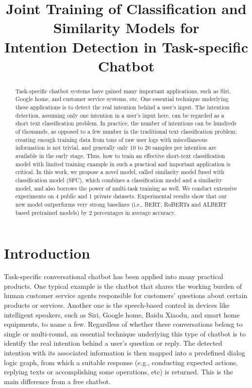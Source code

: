 \documentclass[letterpaper]{article} %
\title{     
  Joint Training of Classification and Similarity Models for \\ 
  Intention Detection in Task-specific Chatbot
}
\begin{document}
  \maketitle
  \linenumbers

  \begin{abstract}
    Task-specific  chatbot systems have gained many important applications, such
    as  Siri,  Google home, and customer service systems, etc. One essential technique 
    underlying these applications  is to detect the real intention behind a user's input.
    The intention detection,  assuming  only  one  intention  in  a  user's input here, can be
    regarded  as  a  short  text  classification problem.  In  practice,  the  number  of
    intentions  can  be hundreds of thousands, as opposed to a few number in the
    traditional text classification problem; creating enough training data from tons of 
    raw user logs with miscellaneous information is not trivial, 
    and generally only 10 to 20 samples per intention are available in  the  early  stage.  
    Thus,  how  to  train  an  effective short-text classification model with limited training
    example in such a practical  and important application is critical. In this work, we propose a
    novel  model, called similarity model fused with classification model (SFC),
    which  combines  a  classification  model  and  a similarity model, and also
    borrows  the  power  of  multi-task  training  as well. We conduct extensive
    experiments  on  4  public  and 1 private datasets. Experimental results
    show that our new model outperforms very strong baselines (i.e., BERT, RoBERTa and
    ALBERT based pretrained models) by 2 percentages in average accuracy.

  \end{abstract}

  \section{Introduction}
  \label{sec:intro}

  Task-specific  conversational  chatbot  \cite{wen2016network}  has been applied
  into  many practical products. One typical example is the chatbot that shares the working burden of
  human  customer  service  agents  responsible  for  customers' questions about
  certain  products  or services. Another one is the speech-based control in
  devices  like  intelligent  speakers, such as Siri, Google home, Baidu Xiaodu,
  and smart home equipments, to name a few. Regardless of whether these conversations belong to
  single or  multi-round, an essential technique underlying this type of chatbot is to
  identify  the  real  intention  behind  a  user's  question or reply. 
  The detected intention  with  its  associated  information  is then mapped into a
  predefined dialog logic graph, from which a suitable response (e.g., conducting 
  expected actions, replying texts or accomplishing some operations, etc)  is returned.
  This  is  the  main  difference  from  a  free chatbot.  
\end{document}
